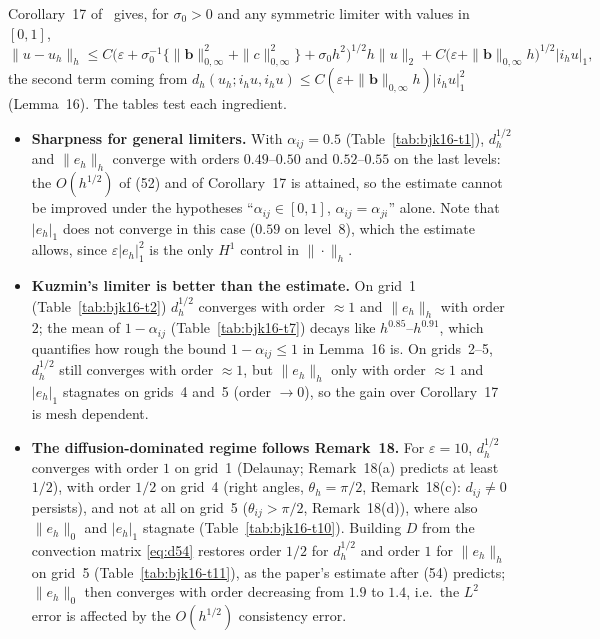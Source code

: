 \documentclass[11pt]{article}
\newcommand{\eps}{\varepsilon}
\newcommand{\bb}{\boldsymbol{b}}
\begin{document}
Corollary~17 of~\cite{BJK16} gives, for $\sigma_0>0$ and any symmetric limiter with values in $[0,1]$,
\[
  \|u-u_h\|_h\le C\bigl(\eps+\sigma_0^{-1}\{\|\bb\|_{0,\infty}^2+\|c\|_{0,\infty}^2\}+\sigma_0h^2\bigr)^{1/2}h\|u\|_2
  +C\bigl(\eps+\|\bb\|_{0,\infty}h\bigr)^{1/2}|i_hu|_1 ,
\]
the second term coming from $d_h(u_h;i_hu,i_hu)\le C(\eps+\|\bb\|_{0,\infty}h)|i_hu|_1^2$ (Lemma~16). The tables test
each ingredient.
\begin{itemize}[leftmargin=*]
\item \textbf{Sharpness for general limiters.} With $\alpha_{ij}=0.5$ (Table~\ref{tab:bjk16-t1}),
  $d_h^{1/2}$ and $\|e_h\|_h$ converge with orders $0.49$--$0.50$ and $0.52$--$0.55$ on the last levels: the
  $O(h^{1/2})$ of (52) and of Corollary~17 is attained, so the estimate cannot be improved under the hypotheses
  ``$\alpha_{ij}\in[0,1]$, $\alpha_{ij}=\alpha_{ji}$'' alone. Note that $|e_h|_1$ does not converge in this case
  ($0.59$ on level~8), which the estimate allows, since $\eps|e_h|_1^2$ is the only $H^1$ control in $\|\cdot\|_h$.
\item \textbf{Kuzmin's limiter is better than the estimate.} On grid~1 (Table~\ref{tab:bjk16-t2})
  $d_h^{1/2}$ converges with order $\approx1$ and $\|e_h\|_h$ with order $2$; the mean of $1-\alpha_{ij}$
  (Table~\ref{tab:bjk16-t7}) decays like $h^{0.85}$--$h^{0.91}$, which quantifies how rough the bound
  $1-\alpha_{ij}\le1$ in Lemma~16 is. On grids~2--5, $d_h^{1/2}$ still converges with order $\approx1$, but
  $\|e_h\|_h$ only with order $\approx1$ and $|e_h|_1$ stagnates on grids~4 and~5 (order $\to0$), so the gain over
  Corollary~17 is mesh dependent.
\item \textbf{The diffusion-dominated regime follows Remark~18.} For $\eps=10$, $d_h^{1/2}$ converges with order
  $1$ on grid~1 (Delaunay; Remark~18(a) predicts at least $1/2$), with order $1/2$ on grid~4 (right angles,
  $\theta_h=\pi/2$, Remark~18(c): $d_{ij}\neq0$ persists), and not at all on grid~5 ($\theta_{ij}>\pi/2$,
  Remark~18(d)), where also $\|e_h\|_0$ and $|e_h|_1$ stagnate (Table~\ref{tab:bjk16-t10}). Building $D$ from the
  convection matrix \eqref{eq:d54} restores order $1/2$ for $d_h^{1/2}$ and order $1$ for $\|e_h\|_h$ on grid~5
  (Table~\ref{tab:bjk16-t11}), as the paper's estimate after (54) predicts; $\|e_h\|_0$ then converges with order
  decreasing from $1.9$ to $1.4$, i.e.\ the $L^2$ error is affected by the $O(h^{1/2})$ consistency error.
\end{itemize}
\end{document}
